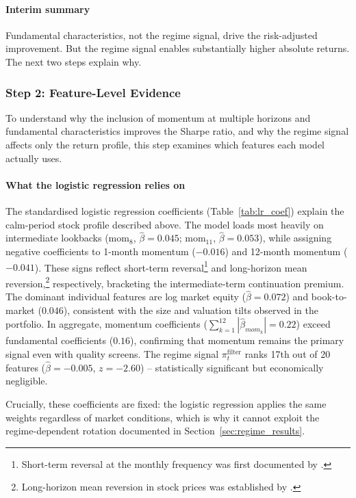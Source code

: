 \paragraph{Interim summary}
Fundamental characteristics, not the regime signal, drive the risk-adjusted improvement. But the regime signal enables substantially higher absolute returns. The next two steps explain why.

\subsubsection{Step 2: Feature-Level Evidence}

To understand why the inclusion of momentum at multiple horizons and fundamental characteristics improves the Sharpe ratio, and why the regime signal affects only the return profile, this step examines which features each model actually uses.

\paragraph{What the logistic regression relies on}

The standardised logistic regression coefficients (Table~\ref{tab:lr_coef}) explain the calm-period stock profile described above. The model loads most heavily on intermediate lookbacks (mom$_{8}$, $\hat{\beta} = 0.045$; mom$_{11}$, $\hat{\beta} = 0.053$), while assigning negative coefficients to 1-month momentum ($-0.016$) and 12-month momentum ($-0.041$). These signs reflect short-term reversal\footnote{Short-term reversal at the monthly frequency was first documented by \citet{Jegadeesh1990}.} and long-horizon mean reversion,\footnote{Long-horizon mean reversion in stock prices was established by \citet{DeBondtThaler1985}.} respectively, bracketing the intermediate-term continuation premium. The dominant individual features are log market equity ($\hat{\beta} = 0.072$) and book-to-market ($0.046$), consistent with the size and valuation tilts observed in the portfolio. In aggregate, momentum coefficients ($\sum_{k=1}^{12}|\hat{\beta}_{mom_k}| = 0.22$) exceed fundamental coefficients ($0.16$), confirming that momentum remains the primary signal even with quality screens. The regime signal $\pi_t^{\text{filter}}$ ranks 17th out of 20 features ($\hat{\beta} = -0.005$, $z = -2.60$) -- statistically significant but economically negligible.



Crucially, these coefficients are fixed: the logistic regression applies the same weights regardless of market conditions, which is why it cannot exploit the regime-dependent rotation documented in Section~\ref{sec:regime_results}.


